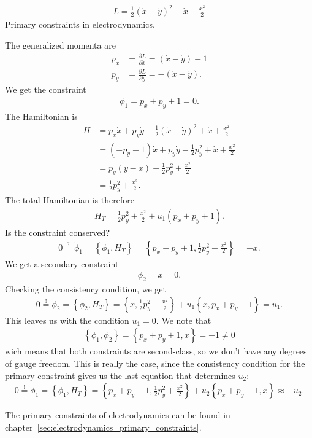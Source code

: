 \newpage

\begin{exercise}
\begin{align*}
L = \frac{1}{2} (\dot{x} - \dot{y})^2 - \dot{x} - \frac{x^2}{2}
\end{align*}
Primary constraints in electrodynamics.
\end{exercise}
\begin{solution}
The generalized momenta are
\begin{align*}
p_x &= \frac{\partial L}{\partial \dot{x}} = (\dot{x} - \dot{y}) - 1 \\
p_y &= \frac{\partial L}{\partial \dot{y}} = -(\dot{x} - \dot{y}).
\end{align*}
We get the constraint 
\begin{align*}
\phi_1 = p_x + p_y + 1 = 0.
\end{align*}
The Hamiltonian is
\begin{align*}
H &= p_x \dot{x} + p_y \dot{y} - \frac{1}{2} (\dot{x} - \dot{y})^2 + \dot{x} + \frac{x^2}{2} \\
&= (-p_y - 1) \dot{x} + p_y \dot{y} - \frac{1}{2} p_y^2 + \dot{x} + \frac{x^2}{2} \\
&= p_y (\dot{y} - \dot{x}) - \frac{1}{2} p_y^2 + \frac{x^2}{2} \\
&= \frac{1}{2} p_y^2 + \frac{x^2}{2}.
\end{align*}
The total Hamiltonian is therefore
\begin{align*}
H_T = \frac{1}{2} p_y^2 + \frac{x^2}{2} + u_1 (p_x + p_y + 1).
\end{align*}
Is the constraint conserved?
\begin{align*}
0 \overset{?}{=} \dot{\phi}_1 = \left \{ \phi_1,H_T \right \} = \left \{ p_x + p_y + 1, \frac{1}{2} p_y^2 + \frac{x^2}{2} \right \} = - x.
\end{align*}
We get a secondary constraint 
\begin{align*}
\phi_2 = x = 0.
\end{align*}
Checking the consistency condition, we get
\begin{align*}
0 \overset{!}{=} \dot{\phi}_2 = \left \{ \phi_2,H_T \right \} = \left \{ x,\frac{1}{2} p_y^2 + \frac{x^2}{2} \right \} + u_1 \left \{ x,p_x + p_y + 1 \right \} = u_1.
\end{align*}
This leaves us with the condition $u_1 = 0$. We note that 
\begin{align*}
\left \{ \phi_1,\phi_2 \right \} = \left \{ p_x + p_y + 1,x \right \} = - 1 \neq 0
\end{align*}
wich means that both constraints are second-class, so we don't have any degrees of gauge freedom. This is really the case, since the consistency condition for the primary constraint gives us the last equation that determines $u_2$:
\begin{align*}
0 \overset{!}{=} \dot{\phi}_1 = \left \{ \phi_1,H_T \right \} = \left \{ p_x + p_y + 1,\frac{1}{2} p_y^2 + \frac{x^2}{2} \right \} + u_2 \left \{ p_x + p_y + 1,x \right \} \approx - u_2.
\end{align*}

The primary constraints of electrodynamics can be found in chapter~\vref{sec:electrodynamics_primary_constraints}.
\end{solution}